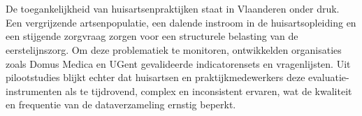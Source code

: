 
%
%
%
%
%

%



\chapter*{}

De toegankelijkheid van huisartsenpraktijken staat in Vlaanderen onder druk. 
Een vergrijzende artsenpopulatie, een dalende instroom in de huisartsopleiding en een stijgende zorgvraag zorgen voor een structurele belasting van de eerstelijnszorg.
Om deze problematiek te monitoren, ontwikkelden organisaties zoals Domus Medica en UGent gevalideerde indicatorensets en vragenlijsten. 
Uit pilootstudies blijkt echter dat huisartsen en praktijkmedewerkers deze evaluatie-instrumenten als te tijdrovend, complex en inconsistent ervaren, wat de kwaliteit en frequentie van de dataverzameling ernstig beperkt.
\medskip

